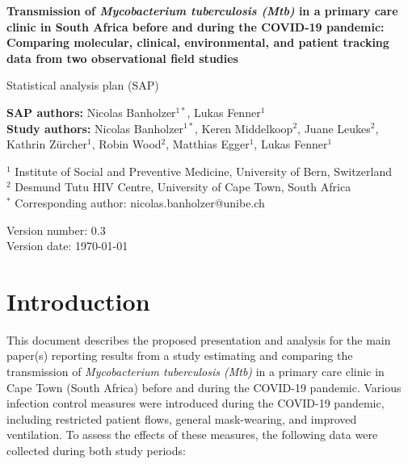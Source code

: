 \documentclass{article}
\begin{document}
\begin{titlepage}
        \vspace*{1cm}
            
        \LARGE
        \textbf{Transmission of \emph{Mycobacterium tuberculosis (\emph{Mtb})} in a primary care clinic in South Africa before and during the COVID-19 pandemic: Comparing molecular, clinical, environmental, and patient tracking data from two observational field studies}
            
        \vspace{0.5cm}
        \Large
        Statistical analysis plan (SAP)
            
        \vspace{1.5cm}
            
        \textbf{SAP authors:} Nicolas Banholzer$^{1*}$, Lukas Fenner$^1$ \\
        \textbf{Study authors:} Nicolas Banholzer$^{1*}$, Keren Middelkoop$^{2}$, Juane Leukes$^{2}$, Kathrin Z\"urcher$^{1}$, Robin Wood$^{2}$, Matthias Egger$^1$, Lukas Fenner$^1$

        \vspace{1cm}

        $^1$ Institute of Social and Preventive Medicine, University of Bern, Switzerland \\
        $^2$ Desmund Tutu HIV Centre, University of Cape Town, South Africa \\
        $^*$ Corresponding author: nicolas.banholzer@unibe.ch
            
        \vfill
            
        \Large
        Version number: 0.3 \\
        Version date: \today 

        \vspace*{1cm}
\end{titlepage}

\tableofcontents

\clearpage

\section{Introduction}

This document describes the proposed presentation and analysis for the main paper(s) reporting results from a study estimating and comparing the transmission of \emph{Mycobacterium tuberculosis (\emph{Mtb})} in a primary care clinic in Cape Town (South Africa) before and during the COVID-19 pandemic. Various infection control measures were introduced during the COVID-19 pandemic, including restricted patient flows, general mask-wearing, and improved ventilation. To assess the effects of these measures, the following data were collected during both study periods:
\end{document}
